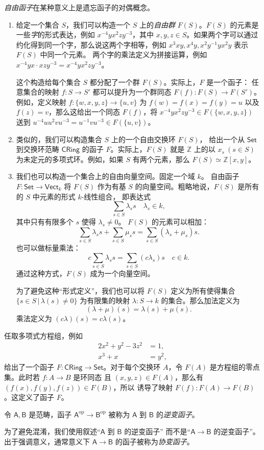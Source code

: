 \documentclass[fontset=none]{Notes}
\newcommand{\cat}[1]{\mathsf{#1}}
\newcommand{\opcat}[1]{\mathsf{#1}^{\mathrm{op}}}
\begin{document}
\begin{example}
  \emph{自由函子}在某种意义上是遗忘函子的对偶概念。
  \begin{enumerate}
    \item 给定一个集合 $S$，我们可以构造一个 $S$ 上的\emph{自由群}
    $F(S)$。$F(S)$ 的元素是一些\emph{字}的形式表达，例如
    $x^{-4}yx^2zy^{-3}$，其中 $x,y,z\in S$。如果两个字可以通过
    约化得到同一个字，那么说这两个字相等，例如
    $x^3xy,x^4y,x^2y^{-1}yx^2y$ 表示 $F(S)$ 中同一个元素。
    两个字的乘法定义为拼接运算，例如 $x^{-4}yx\cdot xzy^{-3}=x^{-4}yx^2zy^{-3}$。

    这个构造给每个集合 $S$ 都分配了一个群 $F(S)$。实际上，$F$ 是一个函子：
    任意集合的映射 $f:S\to S'$ 都可以提升为一个群同态 $F(f):F(S)\to F(S')$。
    例如，定义映射 $f:\{w,x,y,z\}\to\{u,v\}$ 为 $f(w)=f(x)=f(y)=u$
    以及 $f(z)=v$，那么这给出一个同态
    $F(f)$，将 $x^{-4}yx^2zy^{-3}\in F(\{w,x,y,z\})$ 
    送到 $u^{-4}uu^2vu^{-3}=u^{-1}vu^{-3}\in F(\{u,v\})$。
    \item 类似的，我们可以构造集合 $S$ 上的一个自由交换环 $F(S)$，
    给出一个从 $\cat{Set}$ 到交换环范畴 $\cat{CRing}$ 
    的函子 $F$。实际上，$F(S)$ 就是 $\mathbb{Z}$ 上的以 $x_s\ (s\in S)$
    为未定元的多项式环。例如，如果 $S$ 有两个元素，那么
    $F(S)\simeq \mathbb{Z}[x,y]$。
    \item 我们也可以构造一个集合上的自由向量空间。固定一个域 $k$。
    自由函子 $F:\cat{Set}\to\cat{Vect}_k$ 将 $F(S)$ 作为有基 $S$
    的向量空间。粗略地说，$F(S)$ 是所有的 $S$ 中元素的形式 $k$-线性组合，
    即表达式
    \[
      \sum_{s\in S}\lambda_ss\quad \lambda_s\in k,  
    \]
    其中只有有限多个 $s$ 使得 $\lambda_s\neq 0$。
    $F(S)$ 的元素可以相加：
    \[
      \sum_{s\in S}\lambda_ss+\sum_{s\in S}\mu_ss=\sum_{s\in S}
      (\lambda_s+\mu_s)s.  
    \]
    也可以做标量乘法：
    \[
      c\sum_{s\in S}\lambda_ss=\sum_{s\in S}(c\lambda_s)s\quad c\in k.  
    \]
    通过这种方式，$F(S)$ 成为一个向量空间。

    为了避免这种“形式定义”，我们也可以将 $F(S)$ 定义为所有使得集合
    $\{s\in S\,|\, \lambda(s)\ne 0\}$ 为有限集的映射
    $\lambda:S\to k$ 的集合。那么加法定义为
    \[
      (\lambda+\mu)(s)=\lambda(s)+\mu(s).  
    \]
    乘法定义为 $(c\lambda)(s)=c\lambda(s)$。
  \end{enumerate}
\end{example}

\begin{example}
  任取多项式方程组，例如
  \begin{align}
    2x^2+y^2-3z^2&=1,\\
    x^3+x&=y^2,
  \end{align}
  给出了一个函子 $F:\cat{CRing}\to\cat{Set}$。对于每个交换环
  $A$，令 $F(A)$ 是方程组的零点集。此时若 $f:A\to B$ 是环同态
  且 $(x,y,z)\in F(A)$，那么有 $(f(x),f(y),f(z))\in F(B)$，所以
  诱导了映射 $F(f):F(A)\to F(B)$。这定义了函子 $F$。
\end{example}

\begin{definition}
  令 $\cat A,\cat B$ 是范畴，函子 $\opcat A\to\opcat B$ 被称为
  $\cat A$ 到 $\cat B$ 的\emph{逆变函子}。
\end{definition}

为了避免混淆，我们使用叙述“$\cat A$ 到 $\cat B$ 的逆变函子”
而不是“$\cat A\to\cat B$ 的逆变函子”。出于强调意义，通常意义下 $\cat A\to\cat B$
的函子被称为\emph{协变函子}。
\end{document}
